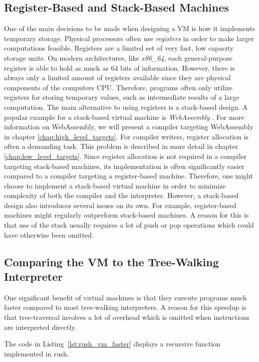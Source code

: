 \subsection{Register-Based and Stack-Based Machines}

One of the main decisions to be made when designing a VM is how it implements temporary storage.
Physical processors often use \emph{registers} in order to make larger computations feasible.
Registers are a limited set of very fast, low capacity storage units.
On modern architectures, like \emph{x86\_64}, each general-purpose register is able to hold as much as 64 bits of information.
However, there is always only a limited amount of registers available since they are physical components of the computers CPU.
Therefore, programs often only utilize registers for storing temporary values, such as intermediate results of a large computation.
The main alternative to using registers is a stack-based design.
A popular example for a stack-based virtual machine is \emph{WebAssembly} \cite[p.~44]{Sendil2022-fy}.
For more information on WebAssembly, we will present a compiler targeting WebAssembly in chapter \ref{chap:high_level_targets}.
For compiler writers, register allocation is often a demanding task.
This problem is described in more detail in chapter \ref{chap:low_level_targets}.
Since register allocation is not required in a compiler targeting stack-based machines, its implementation is often significantly easier compared to a compiler targeting a register-based machine.
Therefore, one might choose to implement a stack-based virtual machine in order to minimize complexity of both the compiler and the interpreter.
However, a stack-based design also introduces several issues on its own.
For example, register-based machines might regularly outperform stack-based machines.
A reason for this is that use of the stack usually requires a lot of push or pop operations which could have otherwise been omitted.

\subsection{Comparing the VM to the Tree-Walking Interpreter}
One significant benefit of virtual machines is that they execute programs much faster compared to most tree-walking interpreters.
A reason for this speedup is that tree-traversal involves a lot of overhead which is omitted when instructions are interpreted directly.

The code in Listing~\ref{lst:rush_vm_faster} displays a recursive function implemented in rush.

